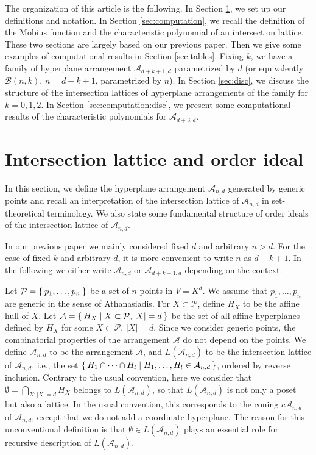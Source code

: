 \documentclass{wstmp}
\begin{document}
The organization of this article is the following.
In Section \ref{sec:def}, we set up our definitions and notation.  
In Section \ref{sec:computation}, we recall the definition of 
the M\"obius function 
and the characteristic polynomial
of an intersection lattice.
These two sections are largely based on our previous paper\cite{1009.3676}.
Then we give some examples of computational results in Section \ref{sec:tables}.
Fixing $k$, we have a family of hyperplane arrangement  ${\mathcal{A}}_{d+k+1,d}$
parametrized by $d$
(or equivalently ${\mathcal{B}}(n,k)$, $n=d+k+1$, parametrized by $n$). 
In Section \ref{sec:disc}, 
we discuss the structure of the intersection lattices
of hyperplane arrangements of the family for $k=0,1,2$.
In Section \ref{sec:computation:disc}, 
we present some computational results of the characteristic polynomials
for ${\mathcal{A}}_{d+3,d}$.

\section{Intersection lattice and order ideal}
\label{sec:def}
In this section, we define the hyperplane arrangement ${\mathcal{A}}_{n,d}$ 
generated by generic points
and recall an interpretation
of the intersection lattice of ${\mathcal{A}}_{n,d}$
in set-theoretical terminology.
We also state some fundamental structure of 
order ideals of the intersection lattice of ${\mathcal{A}}_{n,d}$. 

In our previous paper\cite{1009.3676} we mainly considered fixed $d$ and arbitrary $n>d$.
For the case of fixed $k$ and arbitrary $d$, it is more convenient to write
$n$ as $d+k+1$. In the following we either write ${\mathcal{A}}_{n,d}$ or
${\mathcal{A}}_{d+k+1,d}$ depending on the context.

Let 
${\mathcal{P}}=\Set{p_1,\ldots,p_{n}}$ be
a set of $n$ points 
in $V=K^d$. 
We assume 
that $p_1,\ldots,p_{n}$ are generic 
in the sense of Athanasiadis\cite{athanasiadis2000}.  
For $X\subset {\mathcal{P}}$, define $H_{X}$ to be 
the affine hull of $X$.
Let 
${\mathcal{A}}=\Set{H_{X}| X\subset {\mathcal{P}}, {\left|{X}\right|} = d}$
be the set of all affine hyperplanes defined by $H_{X}$ for some $X\subset{\mathcal{P}}$, 
${\left|{X}\right|}=d$.
Since we consider generic points,
the combinatorial properties of the arrangement ${\mathcal{A}}$ 
do not depend on the points. 
We define ${\mathcal{A}}_{n,d}$ to be the arrangement ${\mathcal{A}}$,
and $L({\mathcal{A}}_{n,d})$ to be the intersection lattice of
${\mathcal{A}}_{n,d}$, 
i.e., the set
$\set{H_1 \cap \cdots \cap H_l | H_1,\ldots, H_l \in {\mathcal{A}}_{n,d}}$,
ordered by reverse inclusion.  
Contrary to the usual convention, 
here we consider that 
$\emptyset = \bigcap_{X\colon {\left|{X}\right|}=d} H_X$ belongs to $L({\mathcal{A}}_{n,d})$, 
so that 
$L({\mathcal{A}}_{n,d})$ is not only a poset but also a lattice\cite{stanley-introduction}.
In the usual convention, 
this corresponds to the coning $c{\mathcal{A}}_{n,d}$ of ${\mathcal{A}}_{n,d}$, 
except that we do not add a coordinate hyperplane.  
The reason for this unconventional definition
is that $\emptyset \in L({\mathcal{A}}_{n,d})$ plays an essential role
for recursive description of $L({\mathcal{A}}_{n,d})$.
\end{document}
